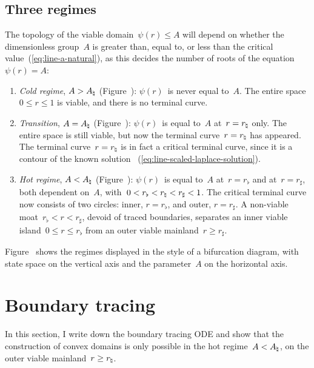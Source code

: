 \subsection{Three regimes}
\label{sec:polar.viable.regimes}

The topology of the viable domain~$\psi (r) \le A$ will depend
on whether the dimensionless group~$A$ is
greater than, equal to, or less than
the critical value~(\ref{eq:line-a-natural}),
as this decides the number of roots of the equation~$\psi (r) = A$:
\begin{enumerate}
  \item
    \emph{Cold regime}, $A > A_\natural$ (Figure~\tbd):
    $\psi (r)$~is never equal to~$A$.
    The entire space~$0 \le r \le 1$ is viable,
    and there is no terminal curve.
  \item
    \emph{Transition}, $A = A_\natural$ (Figure~\tbd):
    $\psi (r)$~is equal to~$A$ at~$r = r_\natural$ only.
    The entire space is still viable,
    but now the terminal curve~$r = r_\natural$ has appeared.
    The terminal curve~$r = r_\natural$ is in fact a critical terminal curve,
    since it is a contour of the known solution~%
      (\ref{eq:line-scaled-laplace-solution}).
  \item
  \label{itm:polar.viable.regimes.hot}
    \emph{Hot regime}, $A < A_\natural$ (Figure~\tbd):
    $\psi (r)$~is equal to~$A$ at~$r = r_\flat$
    and at~$r = r_\sharp$,
    both dependent on~$A$,
    with~$0 <  r_\flat < r_\natural < r_\sharp < 1$.
    The critical terminal curve now consists of two circles:
    inner, $r = r_\flat$, and outer, $r = r_\sharp$.
    A non-viable moat~$r_\flat < r < r_\sharp$,
    devoid of traced boundaries,
    separates an inner viable island~$0 \le r \le r_\flat$
    from an outer viable mainland~$r \ge r_\sharp$.
\end{enumerate}
Figure~\tbd{}
shows the regimes displayed in the style of a bifurcation diagram,
with state space on the vertical axis
and the parameter~$A$ on the horizontal axis.

\section{Boundary tracing}
\label{sec:polar.tracing}

In this section, I write down the boundary tracing ODE
and show that the construction of convex domains
is only possible in the hot regime~$A < A_\natural$,
on the outer viable mainland~$r \ge r_\natural$.

